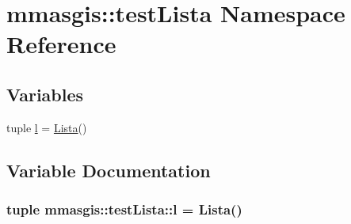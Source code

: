 \hypertarget{namespacemmasgis_1_1testLista}{
\section{mmasgis::testLista Namespace Reference}
\label{namespacemmasgis_1_1testLista}
}
\subsection*{Variables}
\begin{DoxyCompactItemize}
\item 
tuple \hyperlink{namespacemmasgis_1_1testLista_a773b5e335a8a3c4db3dbde85c7539a37}{l} = \hyperlink{classmmasgis_1_1lista_1_1Lista}{Lista}()
\end{DoxyCompactItemize}


\subsection{Variable Documentation}
\hypertarget{namespacemmasgis_1_1testLista_a773b5e335a8a3c4db3dbde85c7539a37}{
\subsubsection[{l}]{\setlength{\rightskip}{0pt plus 5cm}tuple {\bf mmasgis::testLista::l} = {\bf Lista}()}}
\label{namespacemmasgis_1_1testLista_a773b5e335a8a3c4db3dbde85c7539a37}
